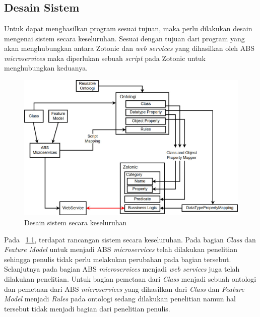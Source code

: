 \chapter{\babTiga}

\section{Desain Sistem}

Untuk dapat menghasilkan program sesuai tujuan, maka perlu dilakukan desain mengenai sistem secara keseluruhan. Sesuai dengan tujuan dari program yang akan menghubungkan antara Zotonic dan \textit{web services} yang dihasilkan oleh ABS \textit{microservices} maka diperlukan sebuah \textit{script} pada Zotonic untuk menghubungkan keduanya.

\begin{figure}
	\centering
	\includegraphics[width=1\textwidth]
		{pics/skripsiRoadmap.jpg}
	\caption{Desain sistem secara keseluruhan}
	\label{fig:skripsiroadmap}
\end{figure}
\vspace{-0.3cm}

Pada \pic~\ref{fig:skripsiroadmap}, terdapat rancangan sistem secara keseluruhan. Pada bagian \textit{Class} dan \textit{Feature Model} untuk menjadi ABS \textit{microservices} telah dilakukan penelitian sehingga penulis tidak perlu melakukan perubahan pada bagian tersebut. Selanjutnya pada bagian ABS \textit{microservices} menjadi \textit{web services} juga telah dilakukan penelitian. Untuk bagian pemetaan dari \textit{Class} menjadi sebuah ontologi dan pemetaan dari ABS \textit{microservices} yang dihasilkan dari \textit{Class} dan \textit{Feature Model} menjadi \textit{Rules} pada ontologi sedang dilakukan penelitian namun hal tersebut tidak menjadi bagian dari penelitian penulis. \\

